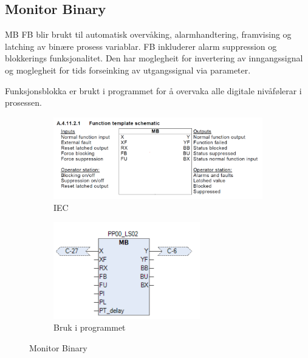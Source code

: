\subsection{Monitor Binary}
\gls{MB} \gls{FB} blir brukt til automatisk overvåking, alarmhandtering, framvising og latching av binære prosess variablar.
\gls{FB} inkluderer alarm suppression og blokkerings funksjonalitet. Den har moglegheit for invertering av 
inngangssignal og moglegheit for tids forseinking av utgangssignal via parameter.

Funksjonsblokka er brukt i programmet for å overvaka alle digitale nivåfølerar i prosessen.


\begin{figure}[htbp]
    \centering
    \begin{subfigure}[b]{0.45\textwidth}
        \centering
        \includegraphics[width=1\textwidth]{Bilder/MBBlokkIEC.png}
        \caption{IEC}\label{fig:Monitor Binary blokk IEC}
    \end{subfigure}
    \hfill
    \begin{subfigure}[b]{0.45\textwidth}
        \centering
        \includegraphics[width=0.7\textwidth]{Bilder/MBBlokkIProgrammet.png}
        \caption{Bruk i programmet}\label{fig:Monitor Binary blokk i programmet}
    \end{subfigure}
    \caption{Monitor Binary}\label{fig:Monitor Binary}
\end{figure}

